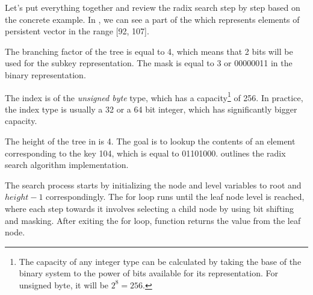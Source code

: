\begin{figure}
\end{figure}

Let's put everything together and review the radix search step by step based on the concrete example. In , we can see a part of the \rbtree{} which represents elements of persistent vector in the range [92, 107].

The branching factor of the tree is equal to 4, which means that 2 bits will be used for the subkey representation. The mask is equal to 3 or 00000011 in the binary representation.

The index is of the \emph{unsigned byte} type, which has a capacity\footnote{The capacity of any integer type can be calculated by taking the base of the binary system to the power of bits available for its representation. For unsigned byte, it will be $2^8 = 256$.} of 256. In practice, the index type is usually a 32 or a 64 bit integer, which has significantly bigger capacity.

The height of the tree in  is 4. The goal is to lookup the contents of an element corresponding to the key 104, which is equal to 01101000.  outlines the radix search algorithm implementation.

The search process starts by initializing the node and level variables to root and $height - 1$ correspondingly. The for loop runs until the leaf node level is reached, where each step towards it involves selecting a child node by using bit shifting and masking. After exiting the for loop, function returns the value from the leaf node.

